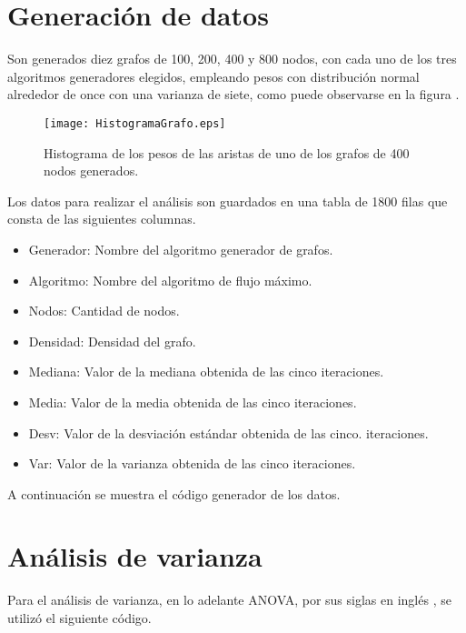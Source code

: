 \documentclass{article}
\begin{document}
\section*{Generación de datos}

Son generados diez grafos de 100, 200, 400 y 800 nodos, con cada uno de los tres algoritmos generadores elegidos, empleando pesos con distribución normal alrededor de once con una varianza de siete, como puede observarse en la figura \pageref{Figura 1}.

\begin{figure}
\begin{center}
  \texttt{[image: HistogramaGrafo.eps]}
\end{center}
\vspace*{-8mm}
\caption{Histograma de los pesos de las aristas de uno de los grafos de 400 nodos generados.}
  \label{Figura 1} 
\end{figure}

Los datos para realizar el análisis son guardados en una tabla de 1800 filas que consta de las siguientes columnas.

\begin{itemize}
\item Generador: Nombre del algoritmo generador de grafos.	
\item Algoritmo: Nombre del algoritmo de flujo máximo.	
\item Nodos: Cantidad de nodos.	
\item Densidad: Densidad del grafo.
\item Mediana: Valor de la mediana obtenida de las cinco iteraciones.	
\item Media: Valor de la media obtenida de las cinco iteraciones.	
\item Desv: Valor de la desviación estándar obtenida de las cinco. iteraciones.
\item Var: Valor de la varianza obtenida de las cinco iteraciones.	
\end{itemize}

A continuación se muestra el código generador de los datos.


\section*{Análisis de varianza}

Para el análisis de varianza, en lo adelante ANOVA, por sus siglas en inglés \citep{anova}, se utilizó el siguiente código.
\end{document}
